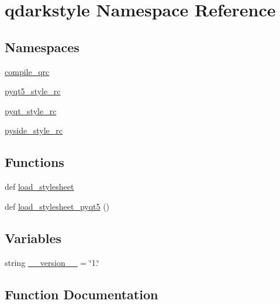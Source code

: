 \hypertarget{namespaceqdarkstyle}{}\section{qdarkstyle Namespace Reference}
\label{namespaceqdarkstyle}
\subsection*{Namespaces}
\begin{DoxyCompactItemize}
\item 
 \hyperlink{namespaceqdarkstyle_1_1compile__qrc}{compile\+\_\+qrc}
\item 
 \hyperlink{namespaceqdarkstyle_1_1pyqt5__style__rc}{pyqt5\+\_\+style\+\_\+rc}
\item 
 \hyperlink{namespaceqdarkstyle_1_1pyqt__style__rc}{pyqt\+\_\+style\+\_\+rc}
\item 
 \hyperlink{namespaceqdarkstyle_1_1pyside__style__rc}{pyside\+\_\+style\+\_\+rc}
\end{DoxyCompactItemize}
\subsection*{Functions}
\begin{DoxyCompactItemize}
\item 
def \hyperlink{namespaceqdarkstyle_ad950ceed7711efb8aefa7a97cf0a26af}{load\+\_\+stylesheet}
\item 
def \hyperlink{namespaceqdarkstyle_a3d0e712f4c8ba060ce109abc32174fb5}{load\+\_\+stylesheet\+\_\+pyqt5} ()
\end{DoxyCompactItemize}
\subsection*{Variables}
\begin{DoxyCompactItemize}
\item 
string \hyperlink{namespaceqdarkstyle_ae725a19acfce831dae1f21c026020f39}{\+\_\+\+\_\+version\+\_\+\+\_\+} = \char`\"{}1.\char`\"{}
\end{DoxyCompactItemize}


\subsection{Function Documentation}
\hypertarget{namespaceqdarkstyle_ad950ceed7711efb8aefa7a97cf0a26af}{}
